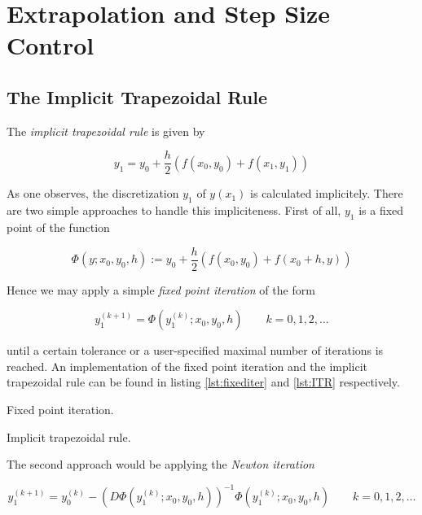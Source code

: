 \section{Extrapolation and Step Size Control}

\subsection{The Implicit Trapezoidal Rule}
The \emph{implicit trapezoidal rule} is given by

\begin{equation}
	y_1 = y_0 + \frac{h}{2}\left( f(x_0,y_0) + f(x_1,y_1) \right)
\end{equation}

As one observes, the discretization $y_1$ of $y(x_1)$ is calculated implicitely. There are two simple approaches to handle this impliciteness. First of all, $y_1$ is a fixed point of the function

\begin{equation}
	\Phi(y;x_0,y_0,h) := y_0 + \frac{h}{2}\left( f(x_0,y_0) + f(x_0 + h,y) \right)
\end{equation}

Hence we may apply a simple \emph{fixed point iteration} of the form

\begin{equation}
	y_1^{(k + 1)} = \Phi\left(y_1^{(k)};x_0,y_0,h\right) \qquad k = 0,1,2,\hdots
\end{equation}

until a certain tolerance or a user-specified maximal number of iterations is reached. An implementation of the fixed point iteration and the implicit trapezoidal rule can be found in listing \ref{lst:fixediter} and \ref{lst:ITR} respectively.

\begin{listing}
	\caption{Fixed point iteration.}
	\label{lst:fixediter}
\end{listing}

\begin{listing}
	\caption{Implicit trapezoidal rule.}
	\label{lst:ITR}
\end{listing}

The second approach would be applying the \emph{Newton iteration}

\begin{equation}
	y_1^{(k + 1)} = y_0^{(k)} - \left( D\Phi\left(y_1^{(k)};x_0,y_0,h\right)\right)^{-1}\Phi\left(y_1^{(k)};x_0,y_0,h\right) \qquad k = 0,1,2,\hdots
\end{equation}
